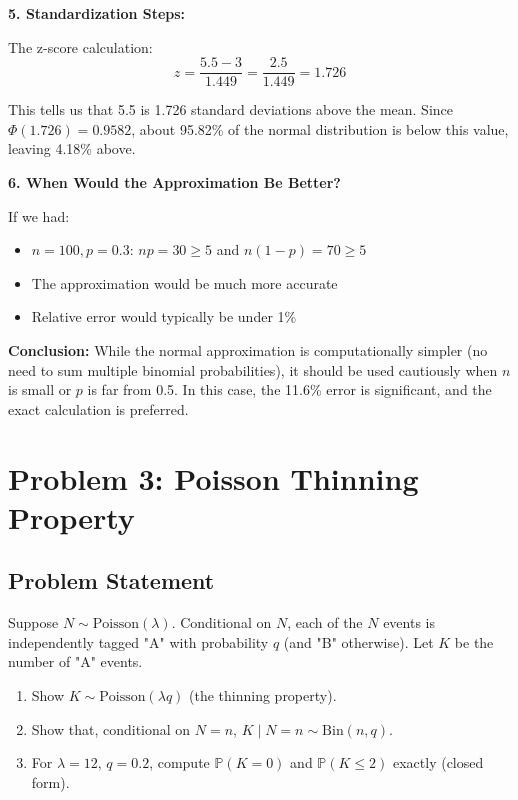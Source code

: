 \documentclass[12pt]{article}
\begin{document}
\begin{explanation}
\textbf{5. Standardization Steps:}

The z-score calculation:
\[
z = \frac{5.5 - 3}{1.449} = \frac{2.5}{1.449} = 1.726
\]

This tells us that 5.5 is 1.726 standard deviations above the mean. Since \(\Phi(1.726) = 0.9582\), about 95.82\% of the normal distribution is below this value, leaving 4.18\% above.

\textbf{6. When Would the Approximation Be Better?}

If we had:
\begin{itemize}
    \item \(n = 100, p = 0.3\): \(np = 30 \geq 5\) and \(n(1-p) = 70 \geq 5\)
    \item The approximation would be much more accurate
    \item Relative error would typically be under 1\%
\end{itemize}

\textbf{Conclusion:} While the normal approximation is computationally simpler (no need to sum multiple binomial probabilities), it should be used cautiously when \(n\) is small or \(p\) is far from 0.5. In this case, the 11.6\% error is significant, and the exact calculation is preferred.
\end{explanation}

\newpage

\section{Problem 3: Poisson Thinning Property}

\subsection{Problem Statement}
Suppose \( N \sim \text{Poisson}(\lambda) \). Conditional on \( N \), each of the \( N \) events is independently tagged "A" with probability \( q \) (and "B" otherwise). Let \( K \) be the number of "A" events.
\begin{enumerate}
\item Show \( K \sim \text{Poisson}(\lambda q) \) (the thinning property).
\item Show that, conditional on \( N = n, \, K \mid N = n \sim \text{Bin}(n, q) \).
\item For \( \lambda = 12, \, q = 0.2 \), compute \(\mathbb{P}(K = 0)\) and \(\mathbb{P}(K \leq 2)\) exactly (closed form).
\end{enumerate}
\end{document}
